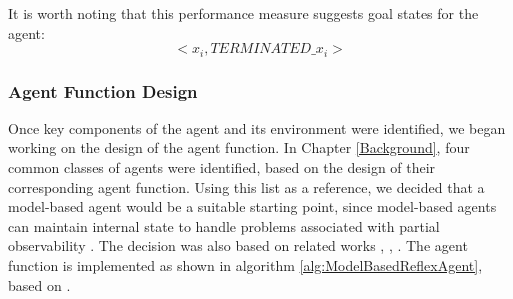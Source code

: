 
It is worth noting that this performance measure suggests goal states for the agent:
\[ <x_i, TERMINATED\_x_i> \]

\subsubsection{Agent Function Design}
Once key components of the agent and its environment were identified, we began working on the design of the agent function. In Chapter \ref{Background}, four common classes of agents were identified, based on the design of their corresponding agent function. Using this list as a reference, we decided that a model-based agent would be a suitable starting point, since model-based agents can maintain internal state to handle problems associated with partial observability \cite{AIAMA}. The decision was also based on related works \cite{Chung2007ASearchb}, \cite{WaharteProbabilisticUAVsb}, \cite{Charrow2014CooperativeLocalization}. The agent function is implemented as shown in algorithm \ref{alg:ModelBasedReflexAgent}, based on \cite[p.~51]{AIAMA}. 

